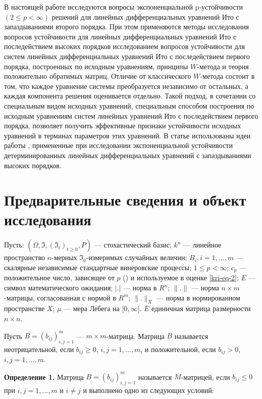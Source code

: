 В настоящей работе исследуются вопросы экспоненциальной p-устойчивости $(2 \le p < \infty)$ решений для линейных дифференциальных уравнений Ито с запаздываниями второго порядка.
При этом применяются методы исследования вопросов устойчивости для линейных дифференциальных уравнений Ито с последействием высоких порядков исследованием вопросов устойчивости для систем линейных дифференциальных уравнений Ито с последействием первого порядка, построенных по исходным уравнениям, принципы  $W$-метода и теория положительно обратимых матриц.
Отличие от классического $W$-метода состоит в том, что каждое уравнение системы преобразуется независимо от остальных, а каждая компонента решения оценивается отдельно.
Такой подход, в сочетании со специальным видом исходных уравнений, специальным способом построения по исходным уравнениям систем линейных уравнений Ито с последействием первого порядка, позволяет получить эффективные признаки устойчивости исходных уравнений в терминах параметров этих уравнений.
В статье использованы идеи работы \cite{kri-bib-16}, примененные при исследовании экспоненциальной устойчивости детерминированных линейных дифференциальных уравнений с запаздываниями высоких порядков.

\section{Предварительные сведения и объект исследования}

Пусть:  $(\Omega, \Im, (\Im_t)_{t \ge 0}, P)$ --- стохастический базис;  $k^n$ --- линейное пространство  $n$-мерных $\Im_0$-измеримых случайных величин;  $B_i, i=1, \dots, m$ --- скалярные независимые стандартные винеровские процессы; $1 \le p < \infty$;  $c_p$ --- положительное число, зависящее от $p$ (\cite[с. 65]{kri-bib-17}) и используемое в оценке \eqref{kri-eq-2}; $E$ --- символ математического ожидания; $|.|$ --- норма в $R^n$; $\|.\|$ --- норма $n \times m$-матрицы, согласованная с нормой в $R^m$; $\|.\|_X$ --- норма в нормированном пространстве  $X$; $\mu$ --- мера Лебега на $[0, \infty [$.
$\overline E$ единичная матрица размерности  $n\times n$.

Пусть $B=(b_{ij})_{i,j=1}^m$ --- $m\times m$-матрица.
Матрица  $B$ называется неотрицательной, если  $b_{ij} \ge 0$, $i,j=1, \dots ,m$, и положительной, если $b_{ij} > 0$, $i, j=1, \dots, m$.

\textbf{Определение 1. } \cite{kri-bib-18} Матрица  $B=(b_{ij})_{i,j=1}^m$ называется $M$-матрицей, если $b_{ij}\le 0$ при  $i,j=1,\dots,m$ и $i\neq j$ и выполнено одно из следующих условий:

